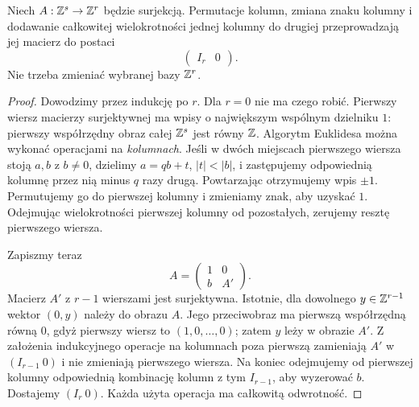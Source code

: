 \begin{lemat}
\label{lem:macierz-surj-hc-19}
Niech $A:\mathbb{Z}^s\to\mathbb{Z}^r$
będzie surjekcją.
Permutacje kolumn, zmiana
znaku kolumny i dodawanie
całkowitej wielokrotności
jednej kolumny do drugiej
przeprowadzają jej macierz
do postaci
\[
       \begin{pmatrix}I_r&0\end{pmatrix}.
\]
Nie trzeba zmieniać
wybranej bazy $\mathbb{Z}^r$.
\end{lemat}
\begin{proof}
Dowodzimy przez indukcję po $r$.
Dla $r=0$ nie ma czego robić.
Pierwszy wiersz macierzy
surjektywnej ma wpisy
o największym wspólnym
dzielniku $1$: pierwszy
współrzędny obraz całej
$\mathbb{Z}^s$ jest równy $\mathbb{Z}$.
Algorytm Euklidesa można
wykonać operacjami na
\emph{kolumnach}.
Jeśli w dwóch miejscach
pierwszego wiersza stoją
$a,b$ z $b\ne0$, dzielimy
$a=qb+t$, $|t|<|b|$,
i zastępujemy odpowiednią
kolumnę przez nią minus
$q$ razy drugą. Powtarzając
otrzymujemy wpis $\pm1$.
Permutujemy go do pierwszej
kolumny i zmieniamy znak,
aby uzyskać $1$.
Odejmując wielokrotności
pierwszej kolumny od
pozostałych, zerujemy
resztę pierwszego wiersza.

Zapiszmy teraz
\[
 A=\begin{pmatrix}
       1&0\\
       b&A'
    \end{pmatrix}.
\]
Macierz $A'$ z $r-1$
wierszami jest surjektywna.
Istotnie, dla dowolnego
$y\in\mathbb{Z}^{r-1}$ wektor
$(0,y)$ należy do obrazu $A$.
Jego przeciwobraz ma
pierwszą współrzędną
równą $0$, gdyż pierwszy
wiersz to $(1,0,\ldots,0)$;
zatem $y$ leży w obrazie
$A'$. Z założenia
indukcyjnego operacje
na kolumnach poza pierwszą
zamieniają $A'$ w
$(I_{r-1}\ 0)$ i nie
zmieniają pierwszego wiersza.
Na koniec odejmujemy
od pierwszej kolumny
odpowiednią kombinację
kolumn z tym $I_{r-1}$,
aby wyzerować $b$.
Dostajemy $(I_r\ 0)$.
Każda użyta operacja
ma całkowitą odwrotność.
\end{proof}

